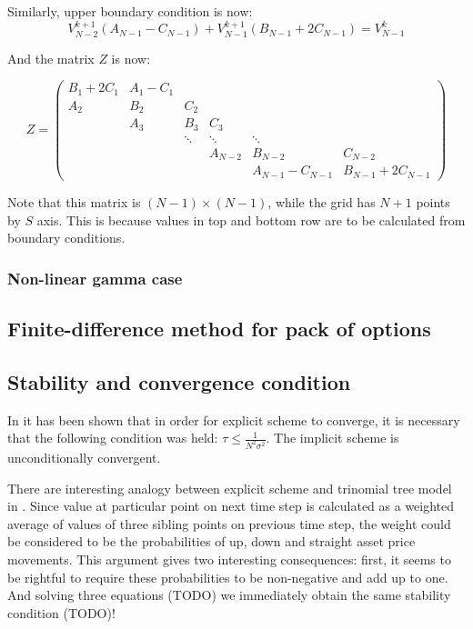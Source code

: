 \documentclass[11pt]{article} %
\begin{document}
Similarly, upper boundary condition is now:
\begin{equation}
V_{N-2}^{k+1} \left(A_{N-1} - C_{N-1} \right)+ V_{N-1}^{k+1} \left( B_{N-1} + 2C_{N-1} \right)=V_{N-1}^{k}
\end{equation}

And the matrix $Z$ is now:


\begin{equation}
Z = 
\begin{pmatrix}
B_1 + 2C_1		& 	A_1 - C_1 	& 	  		& 		 	& 		 				& 						\\
A_2 			& 	B_2 		& 	 C_2	& 		 	& 		 				& 					 	\\
	 			& 	A_3			& 	 B_3 	& C_3	 	& 		 				& 						\\
 				& 		 		& \ddots 	& \ddots 	& 	\ddots 				& 	 					\\
 				& 		 		& 		 	& A_{N-2} 	& 	B_{N-2}				& 	C_{N-2}				\\
 				& 		 		& 		 	& 		 	& 	A_{N-1} - C_{N-1}	& 	B_{N-1} + 2C_{N-1} 	
\end{pmatrix}
\end{equation} 

Note that this matrix is $(N-1) \times (N-1)$, while the grid has $N+1$ points by $S$ axis. This is because values in top and bottom row are to be calculated from boundary conditions.
\subsubsection{Non-linear gamma case}

\subsection{Finite-difference method for pack of options}

\subsection{Stability and convergence condition}
In \cite[ch. ????]{PWoQF06} it has been shown that in order for explicit scheme to converge, it is necessary that the following condition was held: $\tau \leq \frac{1}{N^2\sigma^2}$. The implicit scheme is unconditionally convergent. 

There are interesting analogy between explicit scheme and trinomial tree model in \cite[ch. ???]{Hull03}. Since value at particular point on next time step is calculated as a weighted average of values of three sibling points on previous time step, the weight could be considered to be the probabilities of up, down and straight asset price movements. This argument gives two interesting consequences: first, it seems to be rightful to require these probabilities to be non-negative and add up to one. And solving three equations (TODO) we immediately obtain the same stability condition (TODO)! 
\end{document}
